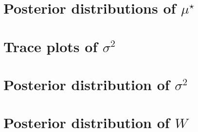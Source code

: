 \documentclass[10pt]{article} %
\begin{document}
\newpage
\section{Posterior distributions of $\mu^\star$}
\begin{figure}[H]
  \begin{center}  %
  \end{center}
  \label{fig:mu}
\end{figure}

\newpage
\section{Trace plots of $\sigma^2$}
\begin{figure}[H]
  \begin{center}  %
  \end{center}
  \label{fig:sigtrace}
\end{figure}

\newpage
\section{Posterior distribution of $\sigma^2$}
\begin{figure}[H]
  \begin{center}  %
  \end{center}
  \label{fig:sig}
\end{figure}

\newpage
\section{Posterior distribution of $W$}
\begin{figure}[H]
  \begin{center}  %
  \end{center}
  \label{fig:w}
\end{figure}

\end{document}
